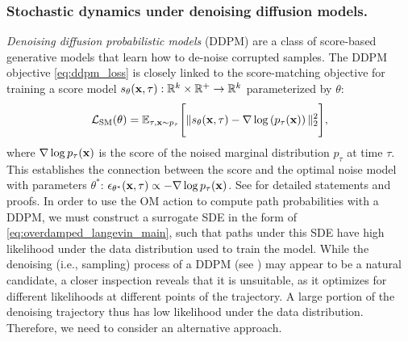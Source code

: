 \subsubsection{Stochastic dynamics under denoising diffusion models.}
\label{sec:stoch_dynamics_gen}
\emph{Denoising diffusion probabilistic models} (DDPM) \cite{ho2020denoising} are a class of score-based generative models that learn how to de-noise corrupted samples. The DDPM objective \eqref{eq:ddpm_loss} is closely linked to the score-matching objective 
\cite{vincent2011connection, song2019generative} for training a score model $s_\theta (\mathbf{x}, \tau): \mathbb{R}^k \times \mathbb{R}^+ \to \mathbb{R}^k$ parameterized by $\theta$:
\begin{equation}
     \mathcal{L}_\text{SM}(\theta) = \mathbb{E}_{\tau, \mathbf{x} \sim p_\tau} \Bigg[ \|s_\theta(\mathbf{x}, \tau) - \nabla \log \left(p_\tau(\mathbf{x})\right)\|_2^2 \Bigg],
     \label{eq:score_matching}
\end{equation}
where $\nabla \log p_\tau(\mathbf{x})$ is the score of the noised marginal distribution $p_\tau$ at time $\tau$. This establishes the connection between the score and the optimal noise model with parameters $\theta^*$: $\epsilon_{\theta^*}(\mathbf{x}, \tau) \propto -\nabla \log p_\tau(\mathbf{x})$. See  for detailed statements and proofs. In order to use the OM action to compute path probabilities with a DDPM, we must construct a surrogate SDE in the form of \eqref{eq:overdamped_langevin_main}, such that paths under this SDE have high likelihood under the data distribution used to train the model. While the denoising (i.e., sampling) process of a DDPM (see ) may appear to be a natural candidate, a closer inspection reveals that it is unsuitable, as it optimizes for different likelihoods at different points of the trajectory. A large portion of the denoising trajectory thus has low likelihood under the data distribution. Therefore, we need to consider an alternative approach.
\vspace{-3pt}
